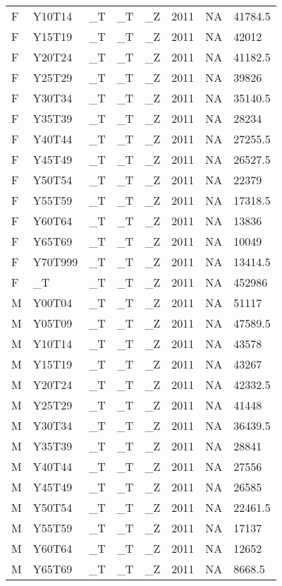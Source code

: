 \begin{longtable}[t]{llllllll}
F & Y10T14 & \_T & \_T & \_Z & 2011 & NA & 41784.5\\
\addlinespace
F & Y15T19 & \_T & \_T & \_Z & 2011 & NA & 42012\\
F & Y20T24 & \_T & \_T & \_Z & 2011 & NA & 41182.5\\
F & Y25T29 & \_T & \_T & \_Z & 2011 & NA & 39826\\
F & Y30T34 & \_T & \_T & \_Z & 2011 & NA & 35140.5\\
F & Y35T39 & \_T & \_T & \_Z & 2011 & NA & 28234\\
\addlinespace
F & Y40T44 & \_T & \_T & \_Z & 2011 & NA & 27255.5\\
F & Y45T49 & \_T & \_T & \_Z & 2011 & NA & 26527.5\\
F & Y50T54 & \_T & \_T & \_Z & 2011 & NA & 22379\\
F & Y55T59 & \_T & \_T & \_Z & 2011 & NA & 17318.5\\
F & Y60T64 & \_T & \_T & \_Z & 2011 & NA & 13836\\
\addlinespace
F & Y65T69 & \_T & \_T & \_Z & 2011 & NA & 10049\\
F & Y70T999 & \_T & \_T & \_Z & 2011 & NA & 13414.5\\
F & \_T & \_T & \_T & \_Z & 2011 & NA & 452986\\
M & Y00T04 & \_T & \_T & \_Z & 2011 & NA & 51117\\
M & Y05T09 & \_T & \_T & \_Z & 2011 & NA & 47589.5\\
\addlinespace
M & Y10T14 & \_T & \_T & \_Z & 2011 & NA & 43578\\
M & Y15T19 & \_T & \_T & \_Z & 2011 & NA & 43267\\
M & Y20T24 & \_T & \_T & \_Z & 2011 & NA & 42332.5\\
M & Y25T29 & \_T & \_T & \_Z & 2011 & NA & 41448\\
M & Y30T34 & \_T & \_T & \_Z & 2011 & NA & 36439.5\\
\addlinespace
M & Y35T39 & \_T & \_T & \_Z & 2011 & NA & 28841\\
M & Y40T44 & \_T & \_T & \_Z & 2011 & NA & 27556\\
M & Y45T49 & \_T & \_T & \_Z & 2011 & NA & 26585\\
M & Y50T54 & \_T & \_T & \_Z & 2011 & NA & 22461.5\\
M & Y55T59 & \_T & \_T & \_Z & 2011 & NA & 17137\\
\addlinespace
M & Y60T64 & \_T & \_T & \_Z & 2011 & NA & 12652\\
M & Y65T69 & \_T & \_T & \_Z & 2011 & NA & 8668.5\\

\end{longtable}
